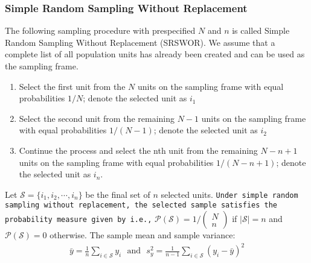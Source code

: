 \documentclass[a4paper,twoside,11pt]{article}
\begin{document}
{\subsubsection{Simple Random Sampling Without Replacement}
The following sampling procedure with prespecified $N$ and $n$ is called Simple Random Sampling Without Replacement (SRSWOR). We assume that a complete list of all population units has already been created and can be used as the sampling frame.
\begin{enumerate}
    \item Select the first unit from the $N$ units on the sampling frame with equal probabilities $1/N$; denote the selected unit as $i_1$
    \item Select the second unit from the remaining $N-1$ units on the sampling frame with equal probabilities $1/(N-1)$; denote the selected unit as $i_2$
    \item Continue the process and select the nth unit from the remaining $N-n + 1$ units on the sampling frame with equal probabilities $1/(N-n+1)$; denote the selected unit as $i_n$.
\end{enumerate}
Let $\mathcal{S} = \{ i_1, i_2, \cdots, i_n \}$ be the final set of $n$ selected units. 
\newline
\newline
\texttt{Under simple random sampling without replacement, the selected sample satisfies the \\ probability measure given by i.e.,} $\mathcal{P(S)} = 1/ \begin{pmatrix}  N \\ n \end{pmatrix}$ if $|\mathcal{S}| =n$ and $\mathcal{P(S)} = 0$ otherwise.
\newline
The sample mean and sample variance:
\begin{equation*}
\begin{aligned}
\bar{y} = \frac{1}{n}\sum_{i \in \mathcal{S}} y_i \ \ \ \text{and} \ \ \ s_y^2 = \frac{1}{n-1} \sum_{i \in \mathcal{S}} (y_i - \bar{y})^2
\end{aligned}
\end{equation*}
}
\end{document}
